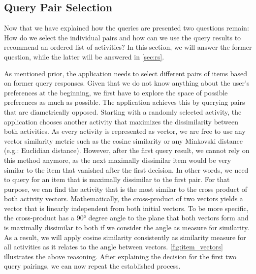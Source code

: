 \documentclass[11pt,a4paper,oneside]{article}
\begin{document}
\subsection{Query Pair Selection}
\label{sec:pair}
Now that we have explained how the queries are presented two questions remain: How do we select the individual pairs and how can we use the query results to recommend an ordered list of activities? In this section, we will answer the former question, while the latter will be answered in \autoref{sec:rs}. 

As mentioned prior, the application needs to select different pairs of items based on former query responses. Given that we do not know anything about the user's preferences at the beginning, we first have to explore the space of possible preferences as much as possible. The application achieves this by querying pairs that are diametrically opposed. Starting with a randomly selected activity, the application chooses another activity that maximizes the dissimilarity between both activities. As every activity is represented as vector, we are free to use any vector similarity metric such as the cosine similarity or any Minkovski distance (e.g.: Euclidian distance). However, after the first query result, we cannot rely on this method anymore, as the next maximally dissimilar item would be very similar to the item that vanished after the first decision. In other words, we need to query for an item that is maximally dissimilar to the first pair. For that purpose, we can find the activity that is the most similar to the cross product of both activity vectors. Mathematically, the cross-product of two vectors yields a vector that is linearly independent from both initial vectors. To be more specific, the cross-product has a 90° degree angle to the plane that both vectors form and is maximally dissimilar to both if we consider the angle as measure for similarity. As a result, we will apply cosine similarity consistently as similarity measure for all activities as it relates to the angle between vectors. \autoref{fig:item_vectors} illustrates the above reasoning. After explaining the decision for the first two query pairings, we can now repeat the established process. 
\end{document}
